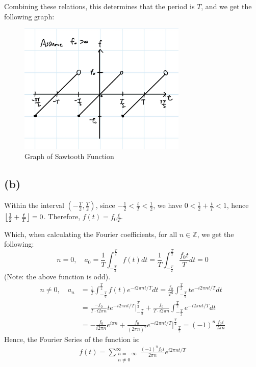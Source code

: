 \documentclass{article}
\newcommand{\ZZ}{\mathbb{Z}}
\DeclarePairedDelimiter{\floor}{\lfloor}{\rfloor}
\begin{document}
Combining these relations, this determines that the period is $T$, and we get the following graph:
\begin{figure}[h!]
    \begin{center}
        \includegraphics[width=80mm]{q4_a.jpg}
        \caption{Graph of Sawtooth Function}
    \end{center}
\end{figure}


\subsection*{(b)}
Within the interval $(-\frac{T}{2},\frac{T}{2})$, since $-\frac{1}{2}<\frac{t}{T}<\frac{1}{2} $, we have $0<\frac{1}{2}+\frac{t}{T}<1$, hence $\floor*{\frac{1}{2}+\frac{t}{T}}=0$. Therefore, $f(t) = f_0\frac{t}{T}$.

Which, when calculating the Fourier coefficients, for all $n\in \ZZ$, we get the following:
\begin{equation}
    n=0,\quad a_0 = \frac{1}{T}\int_{-\frac{T}{2}}^\frac{T}{2}f(t)dt = \frac{1}{T}\int_{-\frac{T}{2}}^\frac{T}{2}\frac{f_0t}{T}dt = 0
\end{equation}
(Note: the above function is odd).
\begin{align}
    n\neq 0,\quad a_n &= \frac{1}{T}\int_{-\frac{T}{2}}^\frac{T}{2}f(t)e^{-i2\pi nt/T}dt = \frac{f_0}{T^2}\int_{-\frac{T}{2}}^\frac{T}{2}te^{-i2\pi nt/T}dt\\
    &=\frac{-f_0}{T\cdot i2\pi n}te^{-i2\pi nt/T}\bigg|_{-\frac{T}{2}}^\frac{T}{2} + \frac{f_0}{T\cdot i2\pi n}\int_{-\frac{T}{2}}^\frac{T}{2}e^{-i2\pi nt/T}dt\\
    &= -\frac{f_0}{i2\pi n}e^{i\pi n} +\frac{f_0}{(2\pi n)^2}e^{-i2\pi nt/T}\bigg|_{-\frac{T}{2}}^\frac{T}{2} = (-1)^{n}\frac{f_0 i}{2\pi n}
\end{align}
Hence, the Fourier Series of the function is:
\begin{align}
    f(t) = \sum_{\substack{n=-\infty\\n\neq 0}}^{\infty}\frac{(-1)^n f_0i}{2\pi n}e^{i2\pi nt/T}
\end{align}
\end{document}
